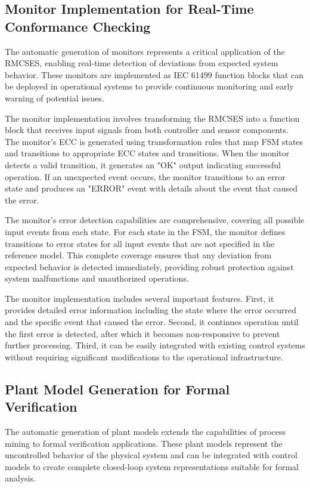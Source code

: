 \subsection{Monitor Implementation for Real-Time Conformance Checking}

The automatic generation of monitors represents a critical application of the RMCSES, enabling real-time detection of deviations from expected system behavior. These monitors are implemented as IEC 61499 function blocks that can be deployed in operational systems to provide continuous monitoring and early warning of potential issues.

The monitor implementation involves transforming the RMCSES into a function block that receives input signals from both controller and sensor components. The monitor's ECC is generated using transformation rules that map FSM states and transitions to appropriate ECC states and transitions. When the monitor detects a valid transition, it generates an "OK" output indicating successful operation. If an unexpected event occurs, the monitor transitions to an error state and produces an "ERROR" event with details about the event that caused the error.



The monitor's error detection capabilities are comprehensive, covering all possible input events from each state. For each state in the FSM, the monitor defines transitions to error states for all input events that are not specified in the reference model. This complete coverage ensures that any deviation from expected behavior is detected immediately, providing robust protection against system malfunctions and unauthorized operations.

The monitor implementation includes several important features. First, it provides detailed error information including the state where the error occurred and the specific event that caused the error. Second, it continues operation until the first error is detected, after which it becomes non-responsive to prevent further processing. Third, it can be easily integrated with existing control systems without requiring significant modifications to the operational infrastructure.

\subsection{Plant Model Generation for Formal Verification}

The automatic generation of plant models extends the capabilities of process mining to formal verification applications. These plant models represent the uncontrolled behavior of the physical system and can be integrated with control models to create complete closed-loop system representations suitable for formal analysis.


